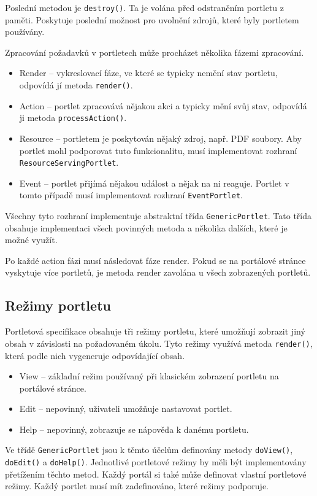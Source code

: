\documentclass{fithesis}
\begin{document}
Poslední metodou je \verb|destroy()|. Ta je volána před odstraněním portletu z paměti. Poskytuje poslední možnost pro uvolnění zdrojů, které byly portletem používány. \cite{jsr-286}

Zpracování požadavků v portletech může procházet několika fázemi zpracování.

\begin{itemize}
\item Render -- vykreslovací fáze, ve které se typicky nemění stav portletu, odpovídá jí metoda \verb|render()|.
\item Action -- portlet zpracovává nějakou akci a typicky mění svůj stav, odpovídá ji metoda \verb|processAction()|.
\item Resource -- portletem je poskytován nějaký zdroj, např. PDF soubory. Aby portlet mohl podporovat tuto funkcionalitu, musí implementovat rozhraní \verb|ResourceServingPortlet|.
\item Event -- portlet přijímá nějakou událost a nějak na ni reaguje. Portlet v tomto případě musí implementovat rozhraní \verb|EventPortlet|.
\end{itemize}

Všechny tyto rozhraní implementuje abstraktní třída \verb|GenericPortlet|. Tato třída obsahuje implementaci všech povinných metoda a několika dalších, které je možné využít.

Po každé action fázi musí následovat fáze render. Pokud se na portálové stránce vyskytuje více portletů, je metoda render zavolána u všech zobrazených portletů. 

\subsection{Režimy portletu}
Portletová specifikace obsahuje tři režimy portletu, které umožňují zobrazit jiný obsah v závislosti na požadovaném úkolu. Tyto režimy využívá metoda \verb|render()|, která podle nich vygeneruje odpovídající obsah.

\begin{itemize}
\item View -- základní režim používaný při klasickém zobrazení portletu na portálové stránce.
\item Edit -- nepovinný, uživateli umožňuje nastavovat portlet.
\item Help -- nepovinný, zobrazuje se nápověda k danému portletu.
\end{itemize}

Ve třídě \verb|GenericPortlet| jsou k těmto účelům definovány metody \verb|doView()|, \verb|doEdit()| a \verb|doHelp()|. Jednotlivé portletové režimy by měli být implementovány přetížením těchto metod. Každý portál si také může definovat vlastní portletové režimy. Každý portlet musí mít zadefinováno, které režimy podporuje.
\end{document}
